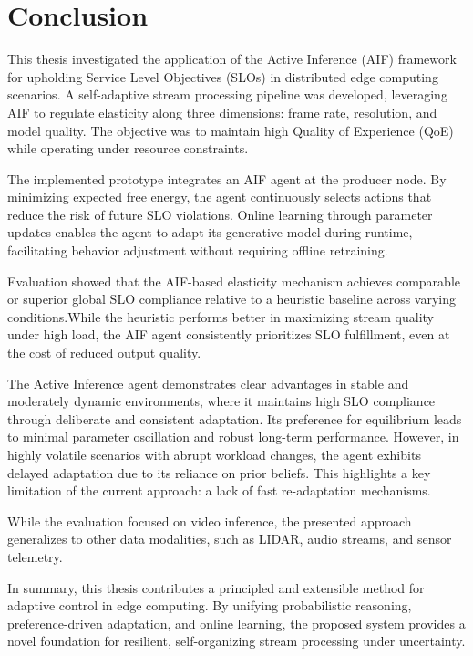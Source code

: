 \chapter{Conclusion}
\label{chap:conclusion}

This thesis investigated the application of the Active Inference (AIF) framework for upholding Service Level Objectives (SLOs) in distributed edge computing scenarios. A self-adaptive stream processing pipeline was developed, leveraging AIF to regulate elasticity along three dimensions: frame rate, resolution, and model quality. The objective was to maintain high Quality of Experience (QoE) while operating under resource constraints.

The implemented prototype integrates an AIF agent at the producer node. By minimizing expected free energy, the agent continuously selects actions that reduce the risk of future SLO violations. Online learning through parameter updates enables the agent to adapt its generative model during runtime, facilitating behavior adjustment without requiring offline retraining.

Evaluation showed that the AIF-based elasticity mechanism achieves comparable or superior global SLO compliance relative to a heuristic baseline across varying conditions.While the heuristic performs better in maximizing stream quality under high load, the AIF agent consistently prioritizes SLO fulfillment, even at the cost of reduced output quality.

The Active Inference agent demonstrates clear advantages in stable and moderately dynamic environments, where it maintains high SLO compliance through deliberate and consistent adaptation. Its preference for equilibrium leads to minimal parameter oscillation and robust long-term performance. However, in highly volatile scenarios with abrupt workload changes, the agent exhibits delayed adaptation due to its reliance on prior beliefs. This highlights a key limitation of the current approach: a lack of fast re-adaptation mechanisms.

While the evaluation focused on video inference, the presented approach generalizes to other data modalities, such as LIDAR, audio streams, and sensor telemetry. 

In summary, this thesis contributes a principled and extensible method for adaptive control in edge computing. By unifying probabilistic reasoning, preference-driven adaptation, and online learning, the proposed system provides a novel foundation for resilient, self-organizing stream processing under uncertainty.
